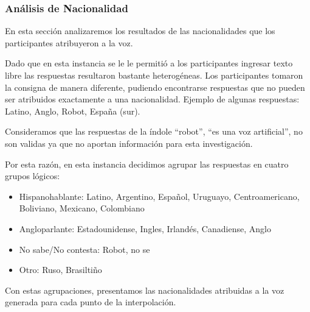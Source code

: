 

\clearpage
\subsubsection{Análisis de Nacionalidad}


En esta sección analizaremos los resultados de las nacionalidades que los participantes atribuyeron a la voz.

Dado que en esta instancia se le le permitió a los participantes ingresar texto libre las respuestas resultaron bastante heterogéneas. Los participantes tomaron la consigna de manera diferente, pudiendo encontrarse respuestas que no pueden ser atribuidos exactamente a una nacionalidad. Ejemplo de algunas respuestas: Latino, Anglo, Robot, España (sur).

Consideramos que las respuestas de la índole ``robot'', ``es una voz artificial'', no son validas ya que no aportan información para esta investigación.

Por esta razón, en esta instancia decidimos agrupar las respuestas en cuatro grupos lógicos:

\begin{itemize}
	\item Hispanohablante: Latino, Argentino, Español, Uruguayo, Centroamericano, Boliviano, Mexicano, Colombiano
	\item Angloparlante: Estadounidense, Ingles, Irlandés, Canadiense, Anglo
	\item No sabe/No contesta: Robot, no se
	\item Otro: Ruso, Brasiltiño
\end{itemize}

Con estas agrupaciones, presentamos las nacionalidades atribuidas a la voz generada para cada punto de la interpolación.

